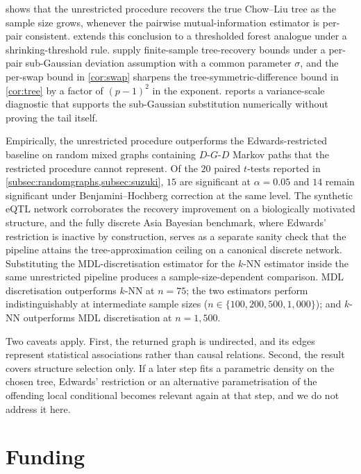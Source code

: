  shows that the unrestricted procedure recovers
the true Chow--Liu tree as the sample size grows, whenever the
pairwise mutual-information estimator is per-pair consistent.
 extends this conclusion to a thresholded
forest analogue under a shrinking-threshold rule.
 supply finite-sample tree-recovery
bounds under a per-pair sub-Gaussian deviation assumption with a
common parameter $\sigma$, and the per-swap bound in
\cref{cor:swap} sharpens the tree-symmetric-difference bound in
\cref{cor:tree} by a factor of $(p-1)^2$ in the exponent.
 reports a variance-scale diagnostic that
supports the sub-Gaussian substitution numerically without proving
the tail itself.

Empirically, the unrestricted procedure outperforms the
Edwards-restricted baseline on random mixed graphs containing
$D$-$G$-$D$ Markov paths that the restricted procedure cannot
represent. Of the $20$ paired $t$-tests reported in
\cref{subsec:randomgraphs,subsec:suzuki}, $15$ are significant at
$\alpha = 0.05$ and $14$ remain significant under
Benjamini--Hochberg correction at the same level. The synthetic eQTL
network corroborates the recovery improvement on a biologically
motivated structure, and the fully discrete Asia Bayesian
benchmark, where Edwards' restriction is inactive by
construction, serves as a separate sanity check that the
pipeline attains the tree-approximation ceiling on a canonical
discrete network. Substituting the MDL-discretisation estimator for the
$k$-NN estimator inside the same unrestricted pipeline produces a
sample-size-dependent comparison. MDL discretisation outperforms
$k$-NN at $n = 75$; the two estimators perform indistinguishably
at intermediate sample sizes ($n \in \{100, 200, 500, 1{,}000\}$);
and $k$-NN outperforms MDL discretisation at $n = 1{,}500$.

Two caveats apply. First, the returned graph is undirected, and
its edges represent statistical associations rather than causal
relations. Second, the result covers structure selection only.
If a later step fits a parametric density on the chosen tree,
Edwards' restriction or an alternative parametrisation of the
offending local conditional becomes relevant again at that step,
and we do not address it here.

\section*{Funding}

